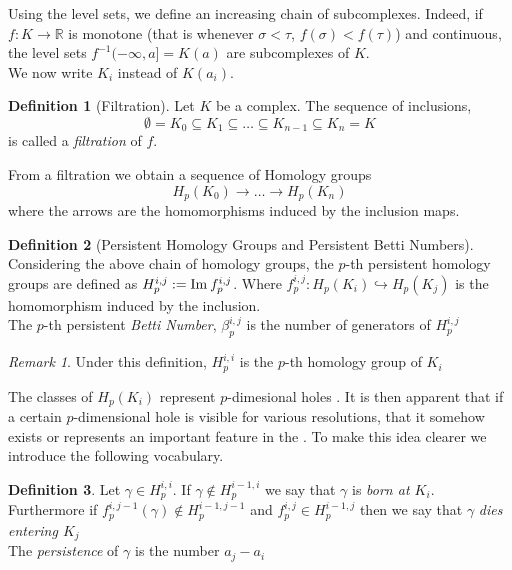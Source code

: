\documentclass{article}
\newcommand{\R}{\mathbb{R}}
\newcommand{\inv}{^{-1}}
\newcommand{\img}{\textmd{Im}\:}
\theoremstyle{plain}
\theoremstyle{definition}
\newtheorem{definition}{Definition}[section]
\theoremstyle{remark}
\newtheorem{remark}{Remark}[section]
\begin{document}
Using the level sets, we define an increasing chain of subcomplexes. Indeed, if $f:K \to \R$ is monotone (that is whenever $\sigma < \tau$, $f(\sigma) < f(\tau)$) and continuous, the level sets $f\inv(-\infty, a] = K(a)$ are subcomplexes of $K$. \\
We now write $K_i$ instead of $K(a_i)$.
\begin{definition}[Filtration]
Let $K$ be a complex. The sequence of inclusions,
\[ \emptyset = K_0 \subseteq K_1 \subseteq \dots \subseteq K_{n-1} \subseteq K_n = K \] is called a \emph{filtration} of $f$.
\end{definition}

From a filtration we obtain a sequence of Homology groups 
\[ H_p(K_0) \rightarrow \dots \rightarrow H_p(K_n) \] where the arrows are the homomorphisms induced by the inclusion maps.

\begin{definition}[Persistent Homology Groups and Persistent Betti Numbers]
Considering the above chain of homology groups, the $p$-th persistent homology groups are defined as $H_p^{i,j} := \img f_p^{i,j}$. Where $f_p^{i,j}: H_p(K_i) \hookrightarrow H_p(K_j)$ is the homomorphism induced by the inclusion. \\
The $p$-th persistent \emph{Betti Number}, $\beta_p^{i,j}$ is the number of generators of $H_p^{i,j}$
\end{definition}
\begin{remark}
Under this definition, $H_p^{i,i}$ is the $p$-th homology group of $K_i$
\end{remark}

The classes of $H_p(K_i)$ represent $p$-dimesional holes . It is then apparent that if a certain $p$-dimensional hole is visible for various resolutions, that it somehow exists or represents an important feature in the . To make this idea clearer we introduce the following vocabulary.

\begin{definition}
Let $\gamma \in H_p^{i,i} $. If $\gamma \notin H_p^{i-1,i}$ we say that $\gamma$ is \emph{born at $K_i$}. \\
Furthermore if $f_p^{i,j-1}(\gamma) \notin H_p^{i-1,j-1}$ and $f_p^{i,j} \in H_p^{i-1,j}$ then we say that $\gamma$ \emph{dies entering $K_j$} \\
The \emph{persistence} of $\gamma$ is the number $a_j-a_i$
\end{definition}
\end{document}
